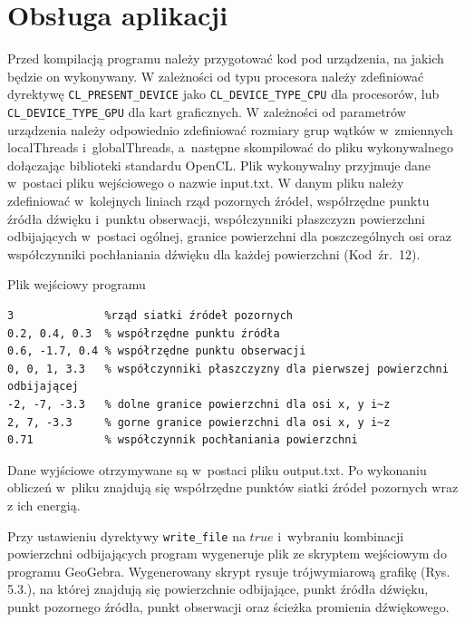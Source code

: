 
\section{Obsługa aplikacji}\label{sec:oa}

Przed kompilacją programu należy przygotować kod pod urządzenia, na jakich  będzie on wykonywany. W zależności od typu procesora należy zdefiniować dyrektywę \verb|CL_PRESENT_DEVICE| jako \verb|CL_DEVICE_TYPE_CPU| dla procesorów, lub \verb|CL_DEVICE_TYPE_GPU| dla kart graficznych. W zależności od parametrów urządzenia należy odpowiednio zdefiniować rozmiary grup wątków w~zmiennych localThreads i~globalThreads, a~następne skompilować do pliku wykonywalnego dołączając biblioteki standardu OpenCL. Plik wykonywalny przyjmuje dane w~postaci pliku wejściowego o nazwie input.txt. W danym pliku należy zdefiniować w~kolejnych liniach  rząd pozornych źródeł, współrzędne punktu źródła dźwięku i~punktu obserwacji, współczynniki płaszczyzn powierzchni odbijających w~postaci ogólnej, granice powierzchni dla poszczególnych osi oraz współczynniki pochłaniania dźwięku dla każdej powierzchni (Kod~źr.~12).

\begin{program}[H]
\caption{Plik wejściowy programu}
\begin{lstlisting}
3              %rząd siatki źródeł pozornych
0.2, 0.4, 0.3  % współrzędne punktu źródła
0.6, -1.7, 0.4 % współrzędne punktu obserwacji
0, 0, 1, 3.3   % współczynniki płaszczyzny dla pierwszej powierzchni odbijającej 
-2, -7, -3.3   % dolne granice powierzchni dla osi x, y i~z 
2, 7, -3.3     % gorne granice powierzchni dla osi x, y i~z
0.71           % współczynnik pochłaniania powierzchni
\end{lstlisting}
\end{program}

Dane wyjściowe otrzymywane są w~postaci pliku output.txt. Po wykonaniu obliczeń w~pliku znajdują się współrzędne punktów siatki źródeł pozornych wraz z ich energią.

Przy ustawieniu dyrektywy \verb|write_file| na $true$ i~wybraniu kombinacji powierzchni odbijających program wygeneruje plik ze skryptem wejściowym do programu GeoGebra. Wygenerowany skrypt rysuje trójwymiarową grafikę (Rys. 5.3.), na której znajdują się powierzchnie odbijające, punkt źródła dźwięku, punkt pozornego źródła, punkt obserwacji oraz ścieżka promienia dźwiękowego.

